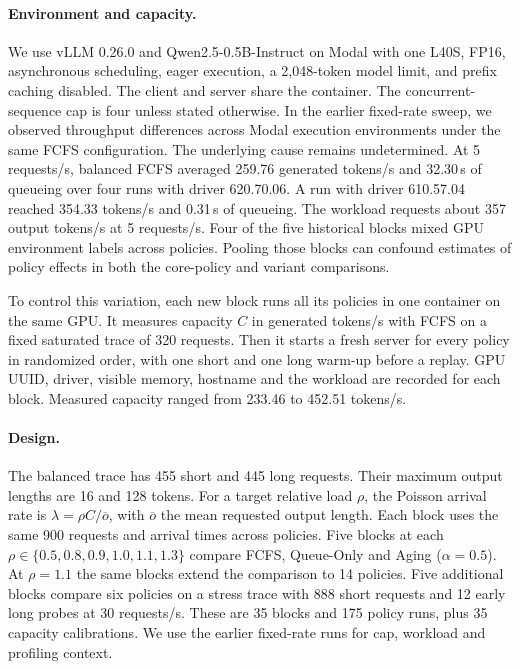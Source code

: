 \documentclass[sigplan,nonacm]{acmart}
\begin{document}
\paragraph{Environment and capacity.}
We use vLLM 0.26.0 and Qwen2.5-0.5B-Instruct on Modal with one L40S,
FP16, asynchronous scheduling, eager execution, a 2,048-token model
limit, and prefix caching disabled. The client and server share the
container. The concurrent-sequence cap is four unless stated otherwise.
In the earlier fixed-rate sweep, we observed throughput differences
across Modal execution environments under the same FCFS configuration.
The underlying cause remains undetermined. At 5 requests/s, balanced
FCFS averaged 259.76 generated tokens/s and 32.30\,s of queueing over
four runs with driver 620.70.06. A run with driver
610.57.04 reached 354.33 tokens/s and 0.31\,s of queueing. The
workload requests about 357 output tokens/s at 5 requests/s.
Four of the five historical blocks mixed GPU environment labels
across policies. Pooling those blocks can confound estimates of
policy effects in both the core-policy and variant comparisons.

To control this variation, each new block runs all its policies in one
container on the same GPU. It measures capacity $C$ in generated
tokens/s with FCFS on a fixed saturated trace of 320 requests.
Then it starts a fresh server for every policy in randomized order,
with one short and one long warm-up before a replay. GPU UUID, driver,
visible memory, hostname and the workload are recorded for each block.
Measured capacity ranged from 233.46 to 452.51 tokens/s.

\paragraph{Design.}
The balanced trace has 455 short and 445 long requests. Their maximum
output lengths are 16 and 128 tokens. For a target relative load $\rho$,
the Poisson arrival rate is $\lambda=\rho C/\overline{o}$, with
$\overline{o}$ the mean requested output length. Each block uses the
same 900 requests and arrival times across policies.
Five blocks at each $\rho\in\{0.5,0.8,0.9,1.0,1.1,1.3\}$ compare
FCFS, Queue-Only and Aging ($\alpha=0.5$). At $\rho=1.1$ the same
blocks extend the comparison to 14 policies. Five additional blocks
compare six policies on a stress trace with 888 short requests and
12 early long probes at 30 requests/s.
These are 35 blocks and 175 policy runs, plus 35 capacity calibrations.
We use the earlier fixed-rate runs for cap, workload and profiling
context.
\end{document}
